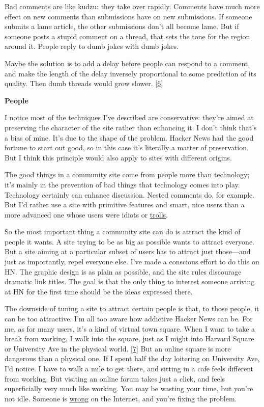 Bad comments are like kudzu: they take over rapidly. Comments have much
more effect on new comments than submissions have on new submissions. If
someone submits a lame article, the other submissions don't all become
lame. But if someone posts a stupid comment on a thread, that sets the
tone for the region around it. People reply to dumb jokes with dumb
jokes.

Maybe the solution is to add a delay before people can respond to a
comment, and make the length of the delay inversely proportional to some
prediction of its quality. Then dumb threads would grow slower.
{[}\hyperref[f6n]{6}{]}

\textbf{People}

I notice most of the techniques I've described are conservative: they're
aimed at preserving the character of the site rather than enhancing it.
I don't think that's a bias of mine. It's due to the shape of the
problem. Hacker News had the good fortune to start out good, so in this
case it's literally a matter of preservation. But I think this principle
would also apply to sites with different origins.

The good things in a community site come from people more than
technology; it's mainly in the prevention of bad things that technology
comes into play. Technology certainly can enhance discussion. Nested
comments do, for example. But I'd rather use a site with primitive
features and smart, nice users than a more advanced one whose users were
idiots or \href{trolls.html}{trolls}.

So the most important thing a community site can do is attract the kind
of people it wants. A site trying to be as big as possible wants to
attract everyone. But a site aiming at a particular subset of users has
to attract just those---and just as importantly, repel everyone else.
I've made a conscious effort to do this on HN. The graphic design is as
plain as possible, and the site rules discourage dramatic link titles.
The goal is that the only thing to interest someone arriving at HN for
the first time should be the ideas expressed there.

The downside of tuning a site to attract certain people is that, to
those people, it can be too attractive. I'm all too aware how addictive
Hacker News can be. For me, as for many users, it's a kind of virtual
town square. When I want to take a break from working, I walk into the
square, just as I might into Harvard Square or University Ave in the
physical world. {[}\hyperref[f7n]{7}{]} But an online square is more
dangerous than a physical one. If I spent half the day loitering on
University Ave, I'd notice. I have to walk a mile to get there, and
sitting in a cafe feels different from working. But visiting an online
forum takes just a click, and feels superficially very much like
working. You may be wasting your time, but you're not idle. Someone is
\href{http://xkcd.com/386/}{wrong} on the Internet, and you're fixing
the problem.

